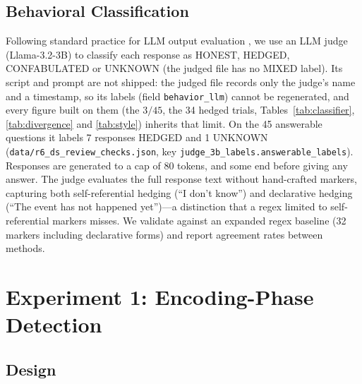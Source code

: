 \documentclass[11pt,a4paper]{article}
\begin{document}
\subsection{Behavioral Classification}

Following standard practice for LLM output evaluation
\citep{zheng2024judging}, we use an LLM judge (Llama-3.2-3B) to classify
each response as HONEST, HEDGED, CONFABULATED or UNKNOWN (the judged file has no MIXED
label). Its script and prompt are not shipped: the judged file records
only the judge's name and a timestamp, so its labels (field
\texttt{behavior\_llm}) cannot be regenerated, and every figure built on
them (the $3/45$, the 34 hedged trials, Tables~\ref{tab:classifier},
\ref{tab:divergence} and \ref{tab:style}) inherits that limit. On the 45
answerable questions it labels 7 responses HEDGED and 1 UNKNOWN
(\texttt{data/\allowbreak r6\_\allowbreak ds\_\allowbreak review\_\allowbreak checks.json}, key
\texttt{judge\_3b\_labels.\allowbreak answerable\_labels}). Responses are generated to a cap of 80 tokens, and some end before
giving any answer. The judge
evaluates the full response text without hand-crafted markers, capturing
both self-referential hedging (``I don't know'') and declarative hedging
(``The event has not happened yet'')---a distinction that a regex limited to
self-referential markers misses. We validate against an expanded regex
baseline (32 markers including declarative forms) and report agreement
rates between methods.

\section{Experiment 1: Encoding-Phase Detection}
\label{sec:encoding}

\subsection{Design}
\end{document}
